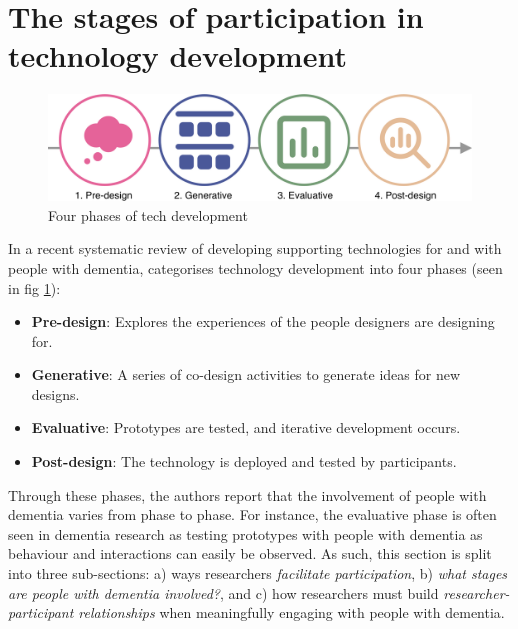 \section{The stages of participation in technology development}
\label{BL:StagesofTech}

\begin{figure}[htp]
    \centering
    \includegraphics[width=0.8\linewidth]{Images/ChapterTwo/PhasesOfTech.png}
    \caption{Four phases of tech development \citep{suijkerbuijk_active_2019}}
    \label{fig:PhasesOfTech}
\end{figure}
In a recent systematic review of developing supporting technologies for and with people with dementia, \cite{suijkerbuijk_active_2019} categorises technology development into four phases (seen in fig \ref{fig:PhasesOfTech}):

\begin{itemize}
    \item \textbf{Pre-design}: Explores the experiences of the people designers are designing for.
    \item \textbf{Generative}: A series of co-design activities to generate ideas for new designs.
    \item \textbf{Evaluative}: Prototypes are tested, and iterative development occurs.
    \item \textbf{Post-design}: The technology is deployed and tested by participants.
\end{itemize}

Through these phases, the authors report that the involvement of people with dementia varies from phase to phase. For instance, the evaluative phase is often seen in dementia research as testing prototypes with people with dementia as behaviour and interactions can easily be observed. As such, this section is split into three sub-sections: a) ways researchers \textit{facilitate participation}, b) \textit{what stages are people with dementia involved?}, and c) how researchers must build \textit{researcher-participant relationships} when meaningfully engaging with people with dementia.

